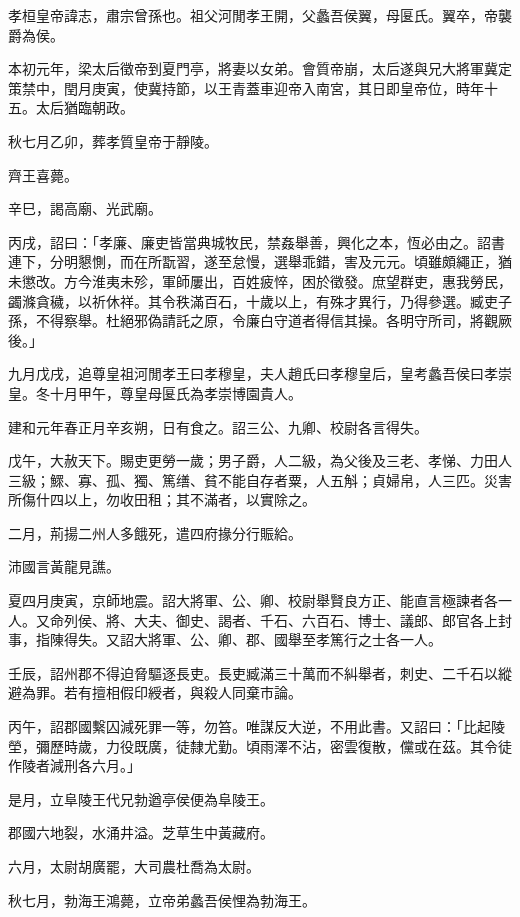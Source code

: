 
\begin{pinyinscope}
孝桓皇帝諱志，肅宗曾孫也。祖父河閒孝王開，父蠡吾侯翼，母匽氏。翼卒，帝襲爵為侯。

本初元年，梁太后徵帝到夏門亭，將妻以女弟。會質帝崩，太后遂與兄大將軍冀定策禁中，閏月庚寅，使冀持節，以王青蓋車迎帝入南宮，其日即皇帝位，時年十五。太后猶臨朝政。

秋七月乙卯，葬孝質皇帝于靜陵。

齊王喜薨。

辛巳，謁高廟、光武廟。

丙戌，詔曰：「孝廉、廉吏皆當典城牧民，禁姦舉善，興化之本，恆必由之。詔書連下，分明懇惻，而在所翫習，遂至怠慢，選舉乖錯，害及元元。頃雖頗繩正，猶未懲改。方今淮夷未殄，軍師屢出，百姓疲悴，困於徵發。庶望群吏，惠我勞民，蠲滌貪穢，以祈休祥。其令秩滿百石，十歲以上，有殊才異行，乃得參選。臧吏子孫，不得察舉。杜絕邪偽請託之原，令廉白守道者得信其操。各明守所司，將觀厥後。」

九月戊戌，追尊皇祖河閒孝王曰孝穆皇，夫人趙氏曰孝穆皇后，皇考蠡吾侯曰孝崇皇。冬十月甲午，尊皇母匽氏為孝崇博園貴人。

建和元年春正月辛亥朔，日有食之。詔三公、九卿、校尉各言得失。

戊午，大赦天下。賜吏更勞一歲；男子爵，人二級，為父後及三老、孝悌、力田人三級；鰥、寡、孤、獨、篤缮、貧不能自存者粟，人五斛；貞婦帛，人三匹。災害所傷什四以上，勿收田租；其不滿者，以實除之。

二月，荊揚二州人多餓死，遣四府掾分行賑給。

沛國言黃龍見譙。

夏四月庚寅，京師地震。詔大將軍、公、卿、校尉舉賢良方正、能直言極諫者各一人。又命列侯、將、大夫、御史、謁者、千石、六百石、博士、議郎、郎官各上封事，指陳得失。又詔大將軍、公、卿、郡、國舉至孝篤行之士各一人。

壬辰，詔州郡不得迫脅驅逐長吏。長吏臧滿三十萬而不糾舉者，刺史、二千石以縱避為罪。若有擅相假印綬者，與殺人同棄巿論。

丙午，詔郡國繫囚減死罪一等，勿笞。唯謀反大逆，不用此書。又詔曰：「比起陵塋，彌歷時歲，力役既廣，徒隸尤勤。頃雨澤不沾，密雲復散，儻或在茲。其令徒作陵者減刑各六月。」

是月，立阜陵王代兄勃遒亭侯便為阜陵王。

郡國六地裂，水涌井溢。芝草生中黃藏府。

六月，太尉胡廣罷，大司農杜喬為太尉。

秋七月，勃海王鴻薨，立帝弟蠡吾侯悝為勃海王。


\end{pinyinscope}

